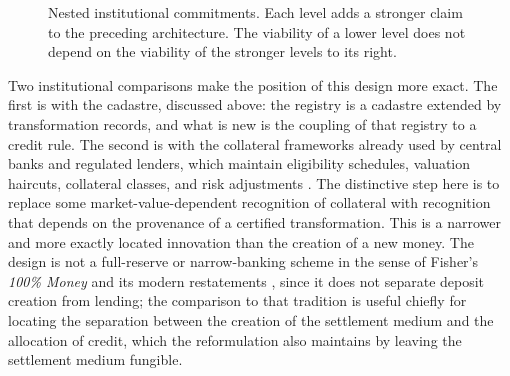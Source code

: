 \documentclass[11pt]{article}
\theoremstyle{definition}
\begin{document}
\begin{figure}[htbp]
\centering
{}
\caption{Nested institutional commitments. Each level adds a stronger claim to the preceding architecture. The viability of a lower level does not depend on the viability of the stronger levels to its right.}
\label{fig:institutional-levels}
\end{figure}


Two institutional comparisons make the position of this design more exact. The first is with the cadastre, discussed above: the registry is a cadastre extended by transformation records, and what is new is the coupling of that registry to a credit rule. The second is with the collateral frameworks already used by central banks and regulated lenders, which maintain eligibility schedules, valuation haircuts, collateral classes, and risk adjustments \cite{bindseil2004, gorton2012}. The distinctive step here is to replace some market-value-dependent recognition of collateral with recognition that depends on the provenance of a certified transformation. This is a narrower and more exactly located innovation than the creation of a new money. The design is not a full-reserve or narrow-banking scheme in the sense of Fisher's \emph{100\% Money} \cite{fisher1935} and its modern restatements \cite{benes2012}, since it does not separate deposit creation from lending; the comparison to that tradition is useful chiefly for locating the separation between the creation of the settlement medium and the allocation of credit, which the reformulation also maintains by leaving the settlement medium fungible.
\end{document}
